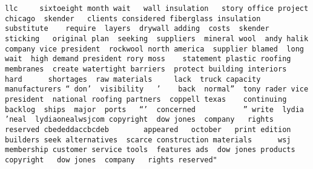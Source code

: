 \documentclass[
]{article}
\begin{document}
\begin{verbatim}
llc     sixtoeight month wait   wall insulation   story office project  chicago  skender   clients considered fiberglass insulation   substitute    require  layers  drywall adding  costs  skender  sticking   original plan  seeking  suppliers  mineral wool  andy halik  company vice president  rockwool north america  supplier blamed  long wait  high demand president rory moss    statement plastic roofing membranes  create watertight barriers  protect building interiors   hard      shortages  raw materials     lack  truck capacity manufacturers “ don’  visibility   ’    back  normal”  tony rader vice president  national roofing partners  coppell texas    continuing backlog  ships  major  ports   “’  concerned           ” write  lydia ’neal  lydiaonealwsjcom copyright  dow jones  company   rights reserved cbededdaccbcdeb        appeared   october   print edition  builders seek alternatives  scarce construction materials      wsj membership customer service tools  features ads  dow jones products copyright   dow jones  company   rights reserved"                                                                                                                                                                                                                                                                                                                                                                                                                                                                                                                                                                                                                                                                                                                                                                                                                                                                                                                                                                                                                                                                                                                                                                                                                                                                                                                                                                                                                                                                                                                                                                                                                                                                                                                                                                                                                                                                                                                                                                                                                                                                                                                                                                                                                                                                                                                                                       
\end{verbatim}
\end{document}
